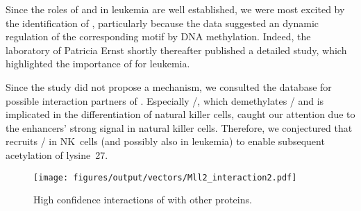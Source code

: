 Since the roles of  and \tfcebpa in leukemia are well established, we were most excited by the identification of , particularly because the data suggested an dynamic regulation of the corresponding motif \motifmlltwo by DNA methylation. Indeed, the laboratory of Patricia Ernst shortly thereafter published a detailed study, which highlighted the importance of  for \mllafnine leukemia\cite{Chen2017a}. 

Since the study did not propose a mechanism, we consulted the  database for possible interaction partners of . Especially /, which demethylates \histwentyseventwo / \histwentyseventhree and is implicated in the differentiation of natural killer cells\cite{Beyaz2017}, caught our attention due to the enhancers' strong \histwentysevenac signal in natural killer cells. Therefore, we conjectured that  recruits / in NK~cells (and possibly also in \mllafnine leukemia) to enable subsequent acetylation of lysine~\num{27}. 

\begin{figure}[!h]
	\centering
	\texttt{[image: figures/output/vectors/Mll2\_interaction2.pdf]} 
	\caption{High confidence interactions of  with other proteins.}
	\label{fig:enhancers:motifs:stringdbmll2}
\end{figure}

